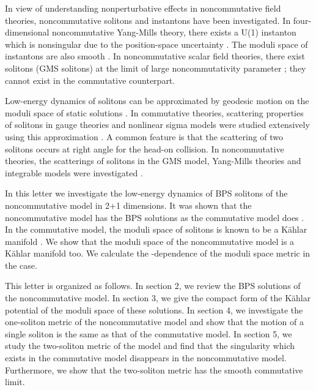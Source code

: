 \documentclass[a4paper,12pt]{article}
\begin{document}
In view of understanding nonperturbative effects in noncommutative field theories,
noncommutative solitons and instantons have been investigated. 
In four-dimensional noncommutative Yang-Mills theory,
there exists a U(1) instanton which is nonsingular 
due to the position-space uncertainty \cite{NS}. The moduli 
space of instantons are also smooth \cite{LTY,Nak}. 
In noncommutative scalar field theories,
there exist solitons (GMS solitons) \cite{GMS}
at the limit of large noncommutativity parameter \myHighlight{$\theta$}\coordHE{};
they cannot exist in the commutative counterpart.

Low-energy dynamics of solitons can be approximated by
geodesic motion on the moduli space of static solutions \cite{Manton}.
In commutative theories,
scattering properties of solitons in gauge theories and nonlinear sigma models
were studied extensively using this approximation \cite{AH,Ward,Leese}.
A common feature is that 
the scattering of two solitons occurs at right angle for the head-on collision.
In noncommutative theories, 
the scatterings of solitons in 
the GMS model, Yang-Mills theories and integrable models
were investigated \cite{Gopak etc,HIO,LP}.

In this letter
we investigate the low-energy dynamics of
BPS solitons of the noncommutative \coordHE{} model in 2+1 dimensions.
It was shown that the noncommutative \coordHE{} model has the BPS solutions 
as the commutative model does \cite{LLY}. 
In the commutative \coordHE{} model,
the moduli space of solitons is known to be a K\"ahlar manifold \cite{Ruback}.
We show that the moduli space of the noncommutative \coordHE{} model is a K\"ahlar manifold too.
We calculate the \myHighlight{$\theta$}\coordHE{}-dependence of the moduli space metric in the \coordHE{} case.

This letter is organized as follows.
In section 2,
we review the BPS solutions of the noncommutative \coordHE{} model.
In section 3,
we give the compact form of the K\"ahlar potential 
of the moduli space of these solutions.
In section 4,
we investigate the one-soliton metric of the noncommutative \coordHE{} model
and show that the motion of a single soliton is the same as that of the commutative model.
In section 5,
we study the two-soliton metric of the 
model and find that the singularity which exists in the commutative 
model disappears in the noncommutative model.
Furthermore,
we show that the two-soliton metric has the smooth commutative limit.
\end{document}
